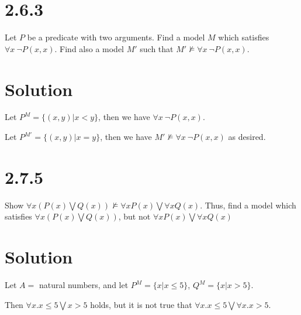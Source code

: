 \documentclass[10pt]{article}
\begin{document}
\section*{2.6.3}
Let $P$ be a predicate with two arguments. Find a model $M$ which satisfies $\forall x\ \lnot P(x,x)$. Find also a model $M'$ such that $M'\not \models \forall x\ \lnot P(x,x)$.

\section*{Solution}

\begin{itemize*}
\item Let $P^{M} = \{ (x,y) | x < y\}$, then we have $\forall x\ \lnot P(x,x)$.
\item Let $P^{M'} = \{ (x,y) | x = y\}$, then we have $M'\not \models \forall x\ \lnot P(x,x)$ as desired.
\end{itemize*}

\section*{2.7.5}
Show $\forall x (P(x) \bigvee Q(x)) \not \models \forall x P(x) \bigvee \forall x Q(x)$. Thus, find a model which satisfies $\forall x (P(x) \bigvee Q(x))$, but not $\forall x P(x) \bigvee \forall x Q(x)$
\section*{Solution} 
\begin{itemize*}
\item Let $A =$ natural numbers, and let $P^{M} = \{ x | x \leq 5 \}$, $Q^{M} = \{ x | x > 5 \}$.
\end{itemize*}
Then $\forall x. x \leq 5 \bigvee x > 5 $ holds, but it is not true that $\forall x. x \leq 5 \bigvee \forall x. x > 5 $.
\end{document}
